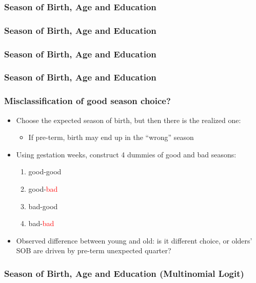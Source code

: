 \documentclass[10pt,letterpaper,subeqn]{beamer}
\begin{document}
\begin{frame}[label=NVSSseason]
\frametitle{Season of Birth, Age and Education}

\end{frame}

\begin{frame}[label=NVSSseasonQ]
\frametitle{Season of Birth, Age and Education}

\end{frame}

\begin{frame}[label=EdInteract]
\frametitle{Season of Birth, Age and Education}

\end{frame}

\begin{frame}[label=birthSeasonYoung34]
\frametitle{Season of Birth, Age and Education}

\end{frame}

\begin{frame}[label=how]
\frametitle{Misclassification of good season choice?}
\begin{itemize}
\item Choose the expected season of birth, but then there is the realized one:
      \begin{itemize}
        \item If pre-term, birth may end up in the ``wrong'' season 
      \end{itemize}
\item Using gestation weeks, construct 4 dummies of good and bad seasons: 
\begin{enumerate}
\item good-\textcolor{cadmiumgreen}{good}
\item good-\textcolor{red}{bad}
\item bad-\textcolor{cadmiumgreen}{good}
\item bad-\textcolor{red}{bad}
\end{enumerate}
\item Observed difference between young and old: is it different choice, or 
olders' SOB are driven by pre-term unexpected quarter?
\end{itemize}

\end{frame}

\begin{frame}[label=NVSSseasonQ]
\frametitle{Season of Birth, Age and Education (Multinomial Logit)}

\end{frame}
\end{document}
